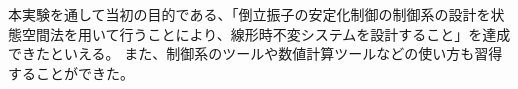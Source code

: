 本実験を通して当初の目的である、「倒立振子の安定化制御の制御系の設計を状態空間法を用いて行うことにより、線形時不変システムを設計すること」を達成できたといえる。
また、制御系のツールや数値計算ツールなどの使い方も習得することができた。